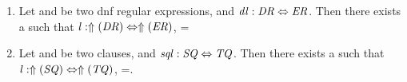 \documentclass[numbers,10pt,preprint\ifanon ,nocopyrightspace\fi]{sigplanconf}
\begin{document}
\begin{lemma}\leavevmode
  \label{lem:dnfcal}
  \begin{enumerate}
  \item Let \DNFRegex{} and \DNFRegexAlt{} be two dnf regular expressions, and $\mathit{dl} : \mathit{DR} \Leftrightarrow \mathit{ER}$.  Then there exists a \Lens{} such that $\mathit{l} : \Uparrow(\mathit{DR}) \Leftrightarrow \Uparrow(\mathit{ER})$, \SemanticsOf{\Lens}=\SemanticsOf{\DNFLens}

  \item Let \Sequence{} and \SequenceAlt{} be two clauses, and $\mathit{sql} : \mathit{SQ} \Leftrightarrow \mathit{TQ}$.  Then there exists a \Lens{} such that $\mathit{l} : \Uparrow(\mathit{SQ}) \Leftrightarrow \Uparrow(\mathit{TQ})$, \SemanticsOf{\Lens}=\SemanticsOf{\SequenceLens}.


\end{enumerate}
\end{lemma}
\end{document}
